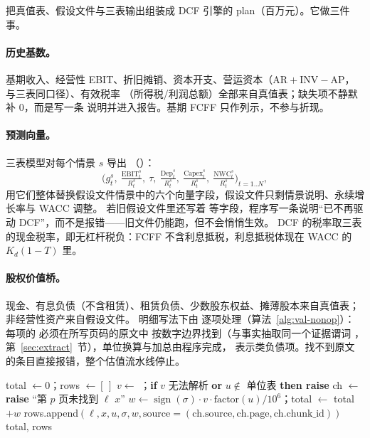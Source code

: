  把真值表、假设文件与三表输出组装成 DCF 引擎的 plan（百万元）。它做三件事。

\paragraph{历史基数。} 基期收入、经营性 EBIT、折旧摊销、资本开支、营运资本（$\text{AR}+\text{INV}-\text{AP}$，与三表同口径）、有效税率
（所得税/利润总额）全部来自真值表；缺失项不静默补 0，而是写一条  说明并进入报告。基期 FCFF 只作列示，不参与折现。

\paragraph{预测向量。} 三表模型对每个情景 $s$ 导出 （）：
\begin{equation}
\Big(g^s_t,\ \tfrac{\text{EBIT}^s_t}{R^s_t},\ \tau,\ \tfrac{\text{Dep}^s_t}{R^s_t},\ \tfrac{\text{Capex}^s_t}{R^s_t},\ \tfrac{\text{NWC}^s_t}{R^s_t}\Big)_{t=1..N},
\label{eq:val-drivers}
\end{equation}
 用它们整体替换假设文件情景中的六个向量字段，假设文件只剩情景说明、永续增长率与 WACC 调整。
若旧假设文件里还写着  等字段，程序写一条说明“已不再驱动 DCF”，而不是报错——旧文件仍能跑，但不会悄悄生效。
DCF 的税率取三表的现金税率，即无杠杆税负：FCFF 不含利息抵税，利息抵税体现在 WACC 的 $K_d(1-T)$ 里。

\paragraph{股权价值桥。} 现金、有息负债（不含租赁）、租赁负债、少数股东权益、摊薄股本来自真值表；非经营性资产来自假设文件。
明细写法下由  逐项处理（算法~\ref{alg:val-nonop}）：每项的  必须在所写页码的原文中
按数字边界找到（与事实抽取同一个证据谓词 ，第~\ref{sec:extract}~节），单位换算与加总由程序完成，
 表示类负债项。找不到原文的条目直接报错，整个估值流水线停止。

\begin{algorithm}[t]
\caption{非经营性资产明细核对（）}
\label{alg:val-nonop}
\begin{algorithmic}[1]
  \State total $\gets 0$；rows $\gets[\,]$
    \State $v\gets$ ；\textbf{if} $v$ 无法解析 \textbf{or} $u\notin$ 单位表 \textbf{then raise}
    \State ch $\gets$  
     \State \textbf{raise} “第 $p$ 页未找到 $\ell$ $x$” \EndIf
    \State $w\gets \operatorname{sign}(\sigma)\cdot v\cdot \text{factor}(u)/10^6$；total $\gets$ total $+w$
    \State rows.append$(\ell,x,u,\sigma,w,\text{source}=(\text{ch.source},\text{ch.page},\text{ch.chunk\_id}))$
  \EndFor
  \State \Return total, rows 
\EndFunction
\end{algorithmic}
\end{algorithm}

